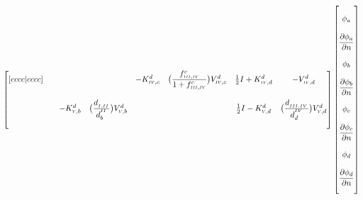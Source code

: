 \documentclass{article}
\newcommand{\RomCap}[1]
    {\MakeUppercase{\scaleto{\romannumeral #1}{3.5pt}}}
\newcommand{\myfrac}[3][0pt]{\genfrac{}{}{}{}{\raisebox{#1}{$#2$}}{\raisebox{-#1}{$#3$}}}
\begin{document}
\begin{equation}
\begin{bmatrix}[cccc|cccc]
	     	 &  &  &  & 

	     	\iffalse
	     	A_{75} &
			\fi
			
			-K^{d}_{\RomCap{4},c} & 	
			
			\iffalse
	     	A_{76} &
			\fi
	     	
	     	\big(\myfrac[3pt]{f_{\RomCap{3},\RomCap{4}}^{c}}{1+f_{\RomCap{3},\RomCap{4}}^{c}}\big)V^{d}_{\RomCap{4},c} &
	     	
	     	\iffalse
	     	A_{77} & A_{78} &
			\fi

			\frac{1}{2}I+K^{d}_{\RomCap{4},d} & -V^{d}_{\RomCap{4},d} \\
             &  &  &  &  &  &  & \\
	     	\iffalse
	     	Row 8 : A_{81} & A_{82} &
			\fi
			
			 &  & 	
			
			\iffalse
	     	A_{83} & 
	     	\fi
			
	     	-K^{d}_{\RomCap{5},b} &

			\iffalse
	     	A_{84} &
			\fi

			\big(\myfrac[3pt]{d_{_{\RomCap{1},\RomCap{2}}}}{d_{b}^{^\RomCap{2}}}\big)V^{d}_{\RomCap{5},b} &
			
			\iffalse
	     	A_{85} & A_{86} & 
	     	\fi
			
	     	 &	 &

			\iffalse
	     	A_{87} &
			\fi

			\frac{1}{2}I-K^{d}_{\RomCap{5},d} & 

			\iffalse
	     	A_{88} \\
			\fi

			\big(\myfrac[3pt]{d_{_{\RomCap{3},\RomCap{4}}}}{d_{d}^{^\RomCap{4}}}\big)V^{d}_{\RomCap{5},d}
			\\ \\
	    \end{bmatrix}
	    \begin{bmatrix}
	    \\
	    \phi_{a} \\ \\
	    \myfrac[3pt]{\partial{\phi_{a}}}{\partial{n}} \\ \\ 
	    \phi_{b} \\ \\
	    \myfrac[3pt]{\partial{\phi_{b}}}{\partial{n}} \\ \\
	    \phi_{c} \\ \\
	    \myfrac[3pt]{\partial{\phi_{c}}}{\partial{n}} \\ \\
	    \phi_{d} \\ \\
	    \myfrac[3pt]{\partial{\phi_{d}}}{\partial{n}}\\ \\


\end{bmatrix}
\end{equation}
\end{document}
